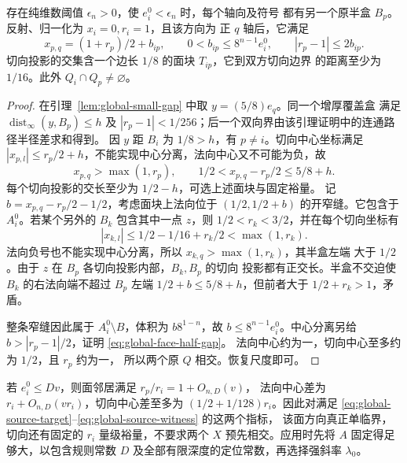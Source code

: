 \begin{lemma}[每个轴向的面邻居]\label{lem:global-face-neighbor}
存在纯维数阈值 \(\epsilon_n>0\)，使 \(e_i^0<\epsilon_n\) 时，每个轴向及符号
都有另一个原半盒 \(B_p\)。反射、归一化为 \(x_i=0,r_i=1\)，且该方向为
正 \(q\) 轴后，它满足
\begin{equation}\label{eq:global-face-half-gap}
 x_{p,q}=(1+r_p)/2+b_{ip},\qquad
 0<b_{ip}\le8^{n-1}e_i^0,\qquad |r_p-1|\le2b_{ip}.
\end{equation}
切向投影的交集含一个边长 \(1/8\) 的面块 \(T_{ip}\)，它到双方切向边界
的距离至少为 \(1/16\)。此外 \(Q_i\cap Q_p\ne\varnothing\)。
\end{lemma}
\begin{proof}
在引理~\ref{lem:global-small-gap} 中取 \(y=(5/8)e_q\)。同一个增厚覆盖盒
满足 \(\operatorname{dist}_\infty(y,B_p)\le h\) 及
\(|r_p-1|<1/256\)；后一个双向界由该引理证明中的连通路径半径差求和得到。
因 \(y\) 距 \(B_i\) 为 \(1/8>h\)，有 \(p\ne i\)。切向中心坐标满足
\(|x_{p,l}|\le r_p/2+h\)，不能实现中心分离，法向中心又不可能为负，故
\[
 x_{p,q}>\max(1,r_p),\qquad
 1/2<x_{p,q}-r_p/2\le5/8+h.
\]
每个切向投影的交长至少为 \(1/2-h\)，可选上述面块与固定裕量。
记 \(b=x_{p,q}-r_p/2-1/2\)，考虑面块上法向位于
\((1/2,1/2+b)\) 的开窄缝。它包含于 \(A_i^0\)。若某个另外的 \(B_k\)
包含其中一点 \(z\)，则 \(1/2<r_k<3/2\)，并在每个切向坐标有
\[
 |x_{k,l}|\le1/2-1/16+r_k/2<\max(1,r_k).
\]
法向负号也不能实现中心分离，所以 \(x_{k,q}>\max(1,r_k)\)，其半盒左端
大于 \(1/2\)。由于 \(z\) 在 \(B_p\) 各切向投影内部，\(B_k,B_p\) 的切向
投影都有正交长。半盒不交迫使 \(B_k\) 的右法向端不超过 \(B_p\) 左端
\(1/2+b\le5/8+h\)，但前者大于 \(1/2+r_k>1\)，矛盾。

整条窄缝因此属于 \(A_i^0\setminus B\)，体积为 \(b8^{1-n}\)，故
\(b\le8^{n-1}e_i^0\)。中心分离另给
\(b>|r_p-1|/2\)，证明 \eqref{eq:global-face-half-gap}。
法向中心约为一，切向中心至多约为 \(1/2\)，且 \(r_p\) 约为一，
所以两个原 \(Q\) 相交。恢复尺度即可。
\end{proof}

若 \(e_i^0\le Dv\)，则面邻居满足 \(r_p/r_i=1+O_{n,D}(v)\)，
法向中心差为 \(r_i+O_{n,D}(vr_i)\)，切向中心差至多为
\((1/2+1/128)r_i\)。因此对满足
\eqref{eq:global-source-target}--\eqref{eq:global-source-witness} 的这两个指标，
该面方向真正单临界，切向还有固定的 \(r_i\) 量级裕量，不要求两个
\(X\) 预先相交。应用时先将 \(A\) 固定得足够大，以包含规则常数 \(D\)
及全部有限深度的定位常数，再选择强斜率 \(\lambda_0\)。

